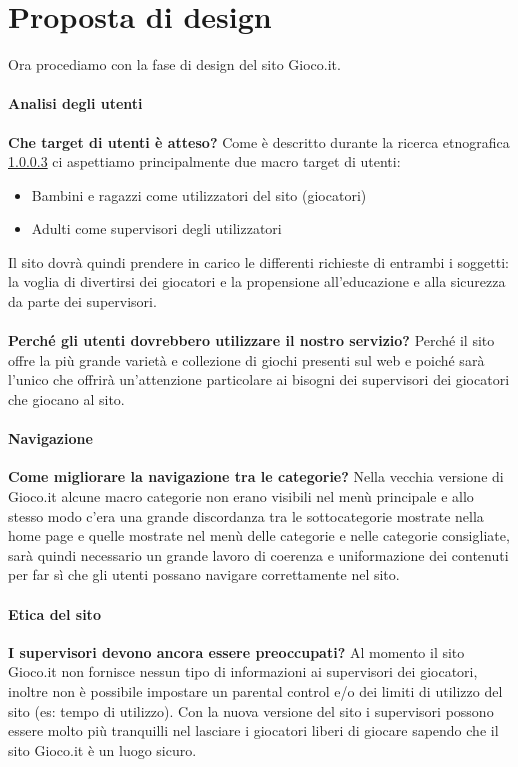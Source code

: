 \documentclass[../Report.tex]{subfiles}
\begin{document}
    \chapter{Proposta di design}
    Ora procediamo con la fase di design del sito Gioco.it.
    \subsubsection{Analisi degli utenti}
    \textbf{Che target di utenti è atteso?} Come è descritto durante la ricerca etnografica \ref{} ci aspettiamo principalmente due macro target di utenti:
    \begin{itemize}
        \item Bambini e ragazzi come utilizzatori del sito (giocatori)
        \item Adulti come supervisori degli utilizzatori 
    \end{itemize}

    Il sito dovrà quindi prendere in carico le differenti richieste di entrambi i soggetti: la voglia di divertirsi dei giocatori e la propensione all'educazione e alla sicurezza da parte dei supervisori.\\
    \\
    \textbf{Perché gli utenti dovrebbero utilizzare il nostro servizio?} Perché il sito offre la più grande varietà e collezione di giochi presenti sul web e poiché sarà l'unico che offrirà un'attenzione particolare ai bisogni dei supervisori dei giocatori che giocano al sito.

    \subsubsection{Navigazione}
    \textbf{Come migliorare la navigazione tra le categorie?} Nella vecchia versione di Gioco.it alcune macro categorie non erano visibili nel menù principale e allo stesso modo c'era una grande discordanza tra le sottocategorie mostrate nella home page e quelle mostrate nel menù delle categorie e nelle categorie consigliate, sarà quindi necessario un grande lavoro di coerenza e uniformazione dei contenuti per far sì che gli utenti possano navigare correttamente nel sito.

    \subsubsection{Etica del sito}
    \textbf{I supervisori devono ancora essere preoccupati?} Al momento il sito Gioco.it non fornisce nessun tipo di informazioni ai supervisori dei giocatori, inoltre non è possibile impostare un parental control e/o dei limiti di utilizzo del sito (es: tempo di utilizzo). Con la nuova versione del sito i supervisori possono essere molto più tranquilli nel lasciare i giocatori liberi di giocare sapendo che il sito Gioco.it è un luogo sicuro.
\end{document}
